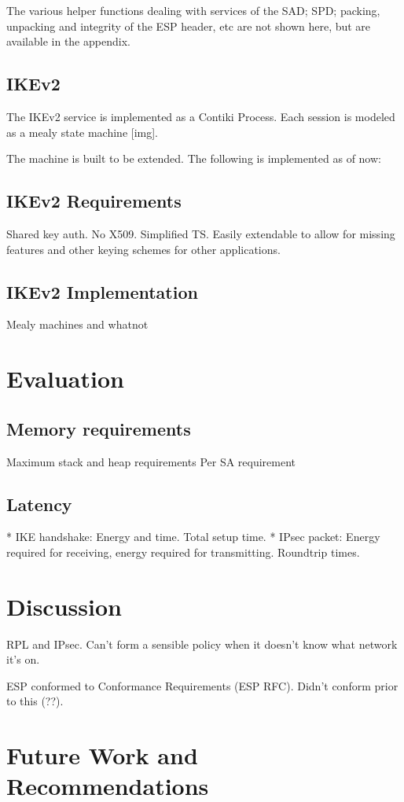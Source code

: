 \documentclass[final,a4paper,twoside,11pt,onecolumn]{report}
\begin{document}
The various helper functions dealing with services of the SAD; SPD; packing, unpacking and integrity of the ESP header, etc are not shown here, but are available in the appendix.


\section{IKEv2}
The IKEv2 service is implemented as a Contiki Process. Each session is modeled as a mealy state machine [img].

The machine is built to be extended. The following is implemented as of now:

\section{IKEv2 Requirements}
Shared key auth. No X509. Simplified TS.
Easily extendable to allow for missing features and other keying schemes for other applications.

\section{IKEv2 Implementation}
Mealy machines and whatnot


\chapter{Evaluation}
\label{cha:eval}

\section{Memory requirements}
Maximum stack and heap requirements
Per SA requirement

\section{Latency}
* IKE handshake: Energy and time. Total setup time.
* IPsec packet: Energy required for receiving, energy required for transmitting. Roundtrip times.




\chapter{Discussion}
RPL and IPsec. Can't form a sensible policy when it doesn't know what network it's on.

ESP conformed to Conformance Requirements (ESP RFC). Didn't conform prior to this (??).


\chapter{Future Work and Recommendations}

\label{cha:fw}




\end{document}
